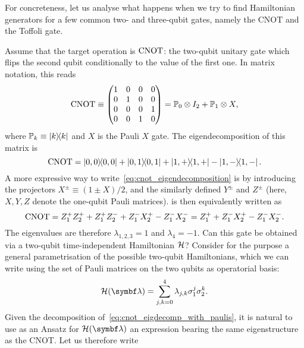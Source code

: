 For concreteness, let us analyse what happens when we try to find Hamiltonian generators for a few common two- and three-qubit gates, namely the CNOT and the Toffoli gate.
\begin{example}[label=ex:eigendecomposition_cnot]
Assume that the target operation is $\operatorname{CNOT}$: the two-qubit unitary gate which flips the second qubit conditionally to the value of the first one.
In matrix notation, this reads
\begin{equation}
    \operatorname{CNOT} \equiv\begin{pmatrix}1&0&0&0 \\ 0&1&0&0 \\ 0&0&0&1\\0&0&1&0\end{pmatrix} =
    \mathbb{P}_0\otimes I_2 + \mathbb{P}_1\otimes X,
\end{equation}
where $\mathbb{P}_k\equiv\ketbra k$ and $X$ is the Pauli $X$ gate.
The eigendecomposition of this matrix is
\begin{equation}
    \operatorname{CNOT} =
    \ketbra{0,0} + \ketbra{0,1} + \ketbra{1,+} - \ketbra{1,-}.
    \label{eq:cnot_eigendecomposition}
\end{equation}
A more expressive way to write~\cref{eq:cnot_eigendecomposition} is by introducing the projectors $X^\pm\equiv(1\pm X)/2$, and the similarly defined $Y^\pm$ and $Z^\pm$ (here, $X,Y,Z$ denote the one-qubit Pauli matrices).
 is then equivalently written as
\begin{equation}
    \operatorname{CNOT} =
    Z^+_1 Z^+_2 + Z^+_1 Z^-_2
    + Z^-_1 X^+_2
    - Z^-_1 X^-_2
    = Z_1^+ + Z_1^- X_2^+ - Z_1^- X_2^-.
    \label{eq:cnot_eigdecomp_with_paulis}
\end{equation}
The eigenvalues are therefore $\lambda_{1,2,3}=1$ and $\lambda_4=-1$.
Can this gate be obtained via a two-qubit time-independent Hamiltonian ${\mathcal{H}}$?
Consider for the purpose a general parametrisation of the possible two-qubit Hamiltonians, which we can write using the set of Pauli matrices on the two qubits as operatorial basis:
\begin{equation}
    \calH({\bs\lambda}) =
    \sum_{j,k=0}^4 \lambda_{j,k} \sigma^j_1\sigma^k_2.
\end{equation}
Given the decomposition of~\cref{eq:cnot_eigdecomp_with_paulis}, it is natural to use as an Ansatz for $\calH(\bs\lambda)$ an expression bearing the same eigenstructure as the CNOT. Let us therefore write
\begin{equation}

\end{equation}
\end{example}
